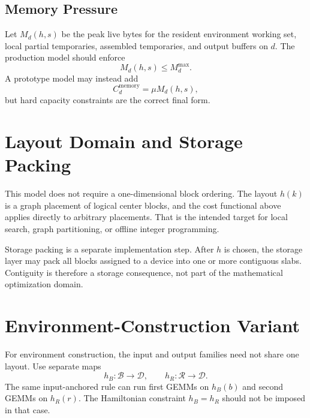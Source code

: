 \documentclass[11pt]{article}
\begin{document}
\subsection{Memory Pressure}

Let $M_d(h,s)$ be the peak live bytes for the resident environment working set,
local partial temporaries, assembled temporaries, and output buffers on $d$.
The production model should enforce
\begin{equation}
  M_d(h,s) \le M^{\max}_d.
\end{equation}
A prototype model may instead add
\begin{equation}
  C^{\mathrm{memory}}_d = \mu M_d(h,s),
\end{equation}
but hard capacity constraints are the correct final form.

\section{Layout Domain and Storage Packing}

This model does not require a one-dimensional block ordering.  The layout
$h(k)$ is a graph placement of logical center blocks, and the cost functional
above applies directly to arbitrary placements.  That is the intended target
for local search, graph partitioning, or offline integer programming.

Storage packing is a separate implementation step.  After $h$ is chosen, the
storage layer may pack all blocks assigned to a device into one or more
contiguous slabs.  Contiguity is therefore a storage consequence, not part of
the mathematical optimization domain.

\section{Environment-Construction Variant}

For environment construction, the input and output families need not share one
layout.  Use separate maps
\begin{equation}
  h_B : \mathcal{B} \to \mathcal{D},
  \qquad
  h_R : \mathcal{R} \to \mathcal{D}.
\end{equation}
The same input-anchored rule can run first GEMMs on $h_B(b)$ and second GEMMs
on $h_R(r)$.  The Hamiltonian constraint $h_B=h_R$ should not be imposed in
that case.
\end{document}
